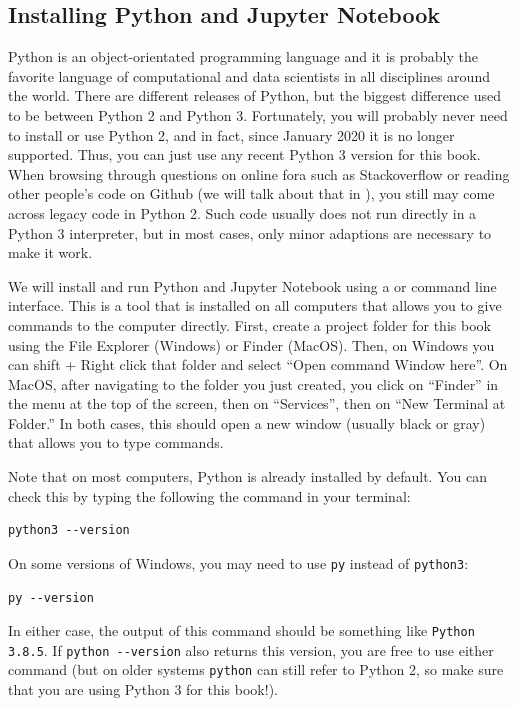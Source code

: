 \subsection{Installing Python and Jupyter Notebook}

Python is an object-orientated programming language
and it is probably the favorite language of computational and data
scientists in all disciplines around the world.
There are different releases of Python, but the biggest difference used to be between Python 2 and Python 3.
Fortunately, you will probably never need to install or use Python 2, and in fact, since January 2020 it is no longer supported.
Thus, you can just use any recent Python 3 version for this book.
When browsing through questions on online fora such as Stackoverflow or reading other people's code on Github (we will talk about that in ), you still may come across legacy code in Python 2. Such code usually does not run directly in a Python 3 interpreter, but in most cases, only minor adaptions are necessary to make it work.

We will install and run Python and Jupyter Notebook using a  or command line interface.
This is a tool that is installed on all computers that allows you to give commands to the computer directly.
First, create a project folder for this book using the File Explorer (Windows) or Finder (MacOS).
Then, on Windows you can shift + Right click that folder and select ``Open command Window here''.
On MacOS, after navigating to the folder you just created, you click on ``Finder'' in the menu at the top of the screen, then on ``Services'', then on ``New Terminal at Folder.''
In both cases, this should open a new window (usually black or gray) that allows you to type commands.

Note that on most computers, Python is already installed by default.
You can check this by typing the following the command in your terminal:

\begin{verbatim}
python3 --version
\end{verbatim}

On some versions of Windows, you may need to use \verb|py| instead of \verb|python3|:
\begin{verbatim}
py --version
\end{verbatim}

In either case, the output of this command should be something like \verb|Python 3.8.5|.
If \verb|python --version| also returns this version, you are free to use either command
(but on older systems \verb|python| can still refer to Python 2, so make sure that you are using Python 3 for this book!).

